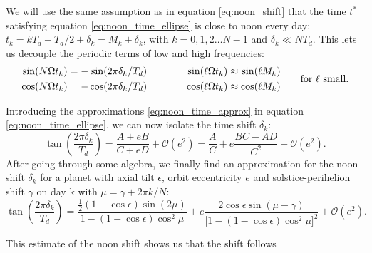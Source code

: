 \documentclass[12pt]{article}
\newcommand{\Sin}{%
  \mathop{\sbox0{$\cos$}\makebox[\wd0][r]{$\sin$}}%
}
\begin{document}
We will use the same assumption as in equation \eqref{eq:noon_shift} that the 
time $t^*$ satisfying equation \eqref{eq:noon_time_ellipse} is close to 
noon every day: $t_k=kT_d+T_d/2+\delta_k=M_k+\delta_k$, with 
$k=0,1,2\ldots N-1$ and $\delta_k \ll NT_d$. 
This lets us decouple the periodic terms of low and high frequencies:
\begin{equation}
    \begin{aligned}
        \Sin(N\Omega t_k) &= -\Sin(2\pi\delta_k / T_d)\\
        \cos(N\Omega t_k) &= -\cos(2\pi\delta_k / T_d)\\
    \end{aligned}
    \qquad\qquad
    \begin{aligned}
        \Sin(\ell\Omega t_k) & \approx \Sin(\ell M_k)\\
        \cos(\ell\Omega t_k) & \approx \cos(\ell M_k)
    \end{aligned}
    \qquad
    \text{for } \ell \text{ small}.
    \label{eq:noon_time_approx}
\end{equation}

Introducing the approximations \eqref{eq:noon_time_approx} in equation 
\eqref{eq:noon_time_ellipse}, we can now isolate the time shift $\delta_k$:
\begin{equation}
    \tan(\frac{2\pi \delta_k}{T_d}) 
     = \frac{A+eB}{C+eD} + \mathcal{O}(e^2)
     = \frac{A}{C} + e \frac{B C - A D}{C^2} + \mathcal{O}(e^2).
\end{equation}
After going through some algebra, we finally find an approximation for 
the noon shift $\delta_k$ for a planet with axial tilt $\epsilon$, 
orbit eccentricity $e$ and solstice-perihelion shift $\gamma$ 
on day k with $\mu=\gamma + 2\pi k/N$:
{\small
\begin{equation}
    \tan(\frac{2\pi \delta_k}{T_d})
    = \frac{\tfrac{1}{2}(1-\cos\epsilon)\sin(2\mu)}{1-(1-\cos\epsilon)\cos^2\mu}
        + e \frac{2\cos\epsilon \sin(\mu-\gamma)}{\big[1-(1-\cos\epsilon)\cos^2\mu\big]^2}
    +\mathcal{O}(e^2).
\end{equation}
}

This estimate of the noon shift shows us that the shift follows 
\end{document}
